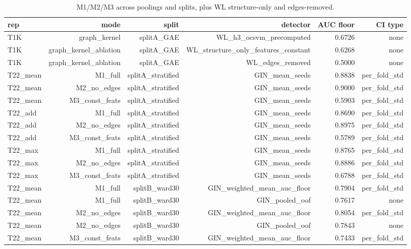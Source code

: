 \begin{table}[ht]
\centering
\caption{M1/M2/M3 across poolings and splits, plus WL structure-only and edges-removed.}
\label{tab:t5-mp}
\begin{tabular}{lrrrrr}
\toprule
rep & mode & split & detector & AUC floor & CI type \\
\midrule
T1K & graph\_kernel & splitA\_GAE & WL\_h3\_ocsvm\_precomputed & 0.6726 & none \\
T1K & graph\_kernel\_ablation & splitA\_GAE & WL\_structure\_only\_features\_constant & 0.6268 & none \\
T1K & graph\_kernel\_ablation & splitA\_GAE & WL\_edges\_removed & 0.5000 & none \\
T22\_mean & M1\_full & splitA\_stratified & GIN\_mean\_seeds & 0.8838 & per\_fold\_std \\
T22\_mean & M2\_no\_edges & splitA\_stratified & GIN\_mean\_seeds & 0.9000 & per\_fold\_std \\
T22\_mean & M3\_const\_feats & splitA\_stratified & GIN\_mean\_seeds & 0.5903 & per\_fold\_std \\
T22\_add & M1\_full & splitA\_stratified & GIN\_mean\_seeds & 0.8690 & per\_fold\_std \\
T22\_add & M2\_no\_edges & splitA\_stratified & GIN\_mean\_seeds & 0.8975 & per\_fold\_std \\
T22\_add & M3\_const\_feats & splitA\_stratified & GIN\_mean\_seeds & 0.5789 & per\_fold\_std \\
T22\_max & M1\_full & splitA\_stratified & GIN\_mean\_seeds & 0.8765 & per\_fold\_std \\
T22\_max & M2\_no\_edges & splitA\_stratified & GIN\_mean\_seeds & 0.8886 & per\_fold\_std \\
T22\_max & M3\_const\_feats & splitA\_stratified & GIN\_mean\_seeds & 0.6788 & per\_fold\_std \\
T22\_mean & M1\_full & splitB\_ward30 & GIN\_weighted\_mean\_auc\_floor & 0.7904 & per\_fold\_std \\
T22\_mean & M1\_full & splitB\_ward30 & GIN\_pooled\_oof & 0.7617 & none \\
T22\_mean & M2\_no\_edges & splitB\_ward30 & GIN\_weighted\_mean\_auc\_floor & 0.8054 & per\_fold\_std \\
T22\_mean & M2\_no\_edges & splitB\_ward30 & GIN\_pooled\_oof & 0.7843 & none \\
T22\_mean & M3\_const\_feats & splitB\_ward30 & GIN\_weighted\_mean\_auc\_floor & 0.7433 & per\_fold\_std \\

\end{tabular}
\end{table}
